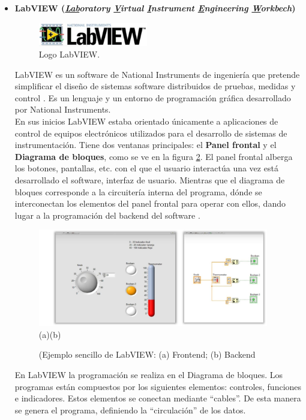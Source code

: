 \begin{itemize}		
	
	\item \textbf{LabVIEW (\textit{\underline{Lab}oratory \underline{V}irtual \underline{I}nstrument \underline{E}ngineering \underline{W}orkbech})}


	\begin{figure}[H]
		\centering
		\includegraphics[width=0.45\textwidth]{./img/LabVIEWicon}
		\caption{Logo LabVIEW. }
		\label{fig:LabVIEWicon}
	\end{figure}


	LabVIEW es un software de National Instruments de ingeniería que pretende simplificar el diseño de sistemas software distribuidos de pruebas, medidas y control \cite{LabVIEWpage}. Es un lenguaje y un entorno de programación gráfica desarrollado por National Instruments. \\	
	En sus inicios LabVIEW estaba orientado únicamente a aplicaciones de control de equipos electrónicos utilizados para el desarrollo de sistemas de instrumentación. Tiene dos ventanas principales: el \textbf{Panel frontal} y el \textbf{Diagrama de bloques}, como se ve en la figura \ref{fig:ejLabVIEW}. El panel frontal alberga los botones, pantallas, etc. con el que el usuario interactúa una vez está desarrollado el software, interfaz de usuario. Mientras que el diagrama de bloques corresponde a la circuitería interna del programa, dónde se interconectan los elementos del panel frontal para operar con ellos, dando lugar a la programación del backend del software \cite{LabVIEWbook}. 

\begin{figure}[H]
	\centering
	\includegraphics[width=0.95\textwidth]{./img/LabVIEWej}
	\\\hspace{2.5cm}(a)\hspace{6.5cm}(b)
	\caption{(Ejemplo sencillo de LabVIEW: (a) Frontend; (b) Backend}\cite{LabVIEWyt} 
	\label{fig:ejLabVIEW}
\end{figure}

	En LabVIEW la programación se realiza en el Diagrama de bloques. Los programas están compuestos por los siguientes elementos: controles, funciones e indicadores. Estos elementos se conectan mediante ``cables''. De esta manera se genera el programa, definiendo la ``circulación'' de los datos.  

\end{itemize}

